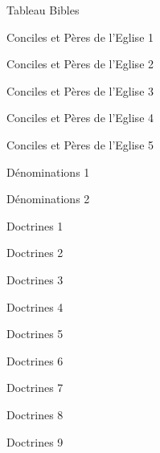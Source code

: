 \documentclass[11pt]{book}
\begin{document}
\clearpage
{}\clearpage
\begin{center}Tableau Bibles\end{center}\clearpage
\clearpage
\begin{center}Conciles et Pères de l'Eglise 1\end{center}\clearpage
\begin{center}Conciles et Pères de l'Eglise 2\end{center}\clearpage
\begin{center}Conciles et Pères de l'Eglise 3\end{center}\clearpage
\begin{center}Conciles et Pères de l'Eglise 4\end{center}\clearpage
\begin{center}Conciles et Pères de l'Eglise 5\end{center}\clearpage
\clearpage
\begin{center}Dénominations 1\end{center}\clearpage
\begin{center}Dénominations 2\end{center}\clearpage
\clearpage
\begin{center}Doctrines 1\end{center}\clearpage
\begin{center}Doctrines 2\end{center}\clearpage
\begin{center}Doctrines 3\end{center}\clearpage
\begin{center}Doctrines 4\end{center}\clearpage
\begin{center}Doctrines 5\end{center}\clearpage
\begin{center}Doctrines 6\end{center}\clearpage
\begin{center}Doctrines 7\end{center}\clearpage
\begin{center}Doctrines 8\end{center}\clearpage
\begin{center}Doctrines 9\end{center}\clearpage
\end{document}
